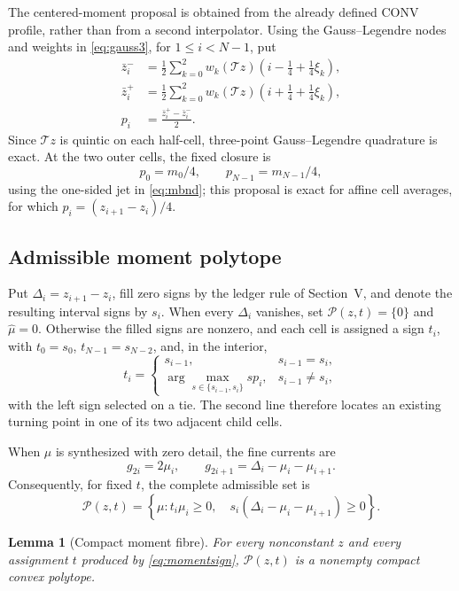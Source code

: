 \documentclass[journal]{IEEEtran}
\newtheorem{lemma}{Lemma}
\newcommand{\Tcal}{\mathcal{T}}
\newcommand{\Pcal}{\mathcal{P}}
\begin{document}
The centered-moment proposal is obtained from the already defined CONV
profile, rather than from a second interpolator. Using the Gauss--Legendre
nodes and weights in \eqref{eq:gauss3}, for \(1\leq i<N-1\), put
\begin{align}
 \bar z_i^-&=\frac12\sum_{k=0}^{2}w_k
 (\Tcal z)(i-\tfrac14+\tfrac14\xi_k),\nonumber\\
 \bar z_i^+&=\frac12\sum_{k=0}^{2}w_k
 (\Tcal z)(i+\tfrac14+\tfrac14\xi_k),
 \label{eq:halfcells}\\
 p_i&=\frac{\bar z_i^+-\bar z_i^-}{2}.
 \label{eq:momentproposal}
\end{align}
Since \(\Tcal z\) is quintic on each half-cell, three-point Gauss--Legendre
quadrature is exact. At the two outer cells, the fixed closure is
\begin{equation}
 p_0=m_0/4,\qquad p_{N-1}=m_{N-1}/4,
 \label{eq:momentboundary}
\end{equation}
using the one-sided jet in \eqref{eq:mbnd}; this proposal is exact for affine
cell averages, for which \(p_i=(z_{i+1}-z_i)/4\).

\subsection{Admissible moment polytope}

Put \(\Delta_i=z_{i+1}-z_i\), fill zero signs by the ledger rule of
Section~V, and denote the resulting interval signs by \(s_i\). When every
\(\Delta_i\) vanishes, set \(\Pcal(z,t)=\{0\}\) and
\(\widehat\mu=0\). Otherwise the filled signs are nonzero, and each cell is
assigned a sign \(t_i\), with \(t_0=s_0\),
\(t_{N-1}=s_{N-2}\), and, in the interior,
\begin{equation}
 t_i=\begin{cases}
 s_{i-1},&s_{i-1}=s_i,\\
 \arg\max_{s\in\{s_{i-1},s_i\}}sp_i,&s_{i-1}\ne s_i,
 \end{cases}
 \label{eq:momentsign}
\end{equation}
with the left sign selected on a tie. The second line therefore locates an
existing turning point in one of its two adjacent child cells.

When \(\mu\) is synthesized with zero detail, the fine currents are
\begin{equation}
 g_{2i}=2\mu_i,\qquad
 g_{2i+1}=\Delta_i-\mu_i-\mu_{i+1}.
 \label{eq:finecurrentmoment}
\end{equation}
Consequently, for fixed \(t\), the complete admissible set is
\begin{equation}
 \Pcal(z,t)=\left\{\mu:
 t_i\mu_i\geq0,\quad
 s_i(\Delta_i-\mu_i-\mu_{i+1})\geq0
 \right\}.
 \label{eq:momentpolytope}
\end{equation}
\begin{lemma}[Compact moment fibre]
For every nonconstant \(z\) and every assignment \(t\) produced by
\eqref{eq:momentsign}, \(\Pcal(z,t)\) is a nonempty compact convex polytope.
\end{lemma}
\end{document}
